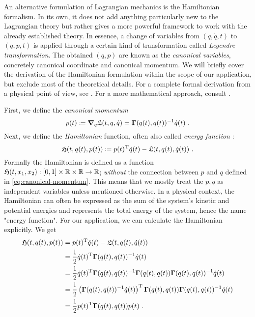 An alternative formulation of Lagrangian mechanics is the Hamiltonian formalism.
In its own, it does not add anything particularly new to the Lagrangian theory but rather gives a more powerful framework to work with the already established theory.
In essence, a change of variables from $(q, \dot{q}, t)$ to $(q, p, t)$ is applied through a certain kind of transformation called \emph{Legendre transformation}.
The obtained $(q, p)$ are known as the \emph{canonical variables}, concretely canonical coordinate and canonical momentum.
We will briefly cover the derivation of the Hamiltonian formulation within the scope of our application, but exclude most of the theoretical details.
For a complete formal derivation from a physical point of view, see \cite[Chapter~8]{goldstein01}.
For a more mathematical approach, consult \cite[Chapter~2]{marsden10}.

First, we define the \emph{canonical momentum}
\begin{equation}
\label{eq:canonical-momentum}
	p(t) \coloneqq \grad_{\dot{q}} \mathfrak{L}(t, q, \dot{q}) = \mathbf{\Gamma}(q(t), q(t))^{-1} \dot{q}(t) \ .
\end{equation}
Next, we define the \emph{Hamiltonian} function, often also called \emph{energy function} \cite{marsden10}:
\begin{equation}
	\mathfrak{H}(t, q(t), p(t)) \coloneqq p(t)^\mathrm{T}\dot{q}(t) - \mathfrak{L}(t, q(t), \dot{q}(t)) \ .
\end{equation}
Formally the Hamiltonian is defined as a function $\mathfrak{H}(t, x_1, x_2): [0,1] \times \mathbb{R} \times \mathbb{R} \rightarrow \mathbb{R}$; \emph{without} the connection between $p$ and $q$ defined in \cref{eq:canonical-momentum}.
This means that we mostly treat the $p, q$ as independent variables unless mentioned otherwise.
In a physical context, the Hamiltonian can often be expressed as the sum of the system's kinetic and potential energies and represents the total energy of the system, hence the name "energy function".
For our application, we can calculate the Hamiltonian explicitly.
We get
\begin{align}
	\mathfrak{H}(t, q(t), p(t)) &=p(t)^\mathrm{T}\dot{q}(t) - \mathfrak{L}(t, q(t), \dot{q}(t))\\
	&= \frac{1}{2} \dot{q}(t)^{\mathrm{T}} \mathbf{\Gamma}(q(t), q(t))^{-1} \dot{q}(t) \\
	&= \frac{1}{2} \dot{q}(t)^{\mathrm{T}} \mathbf{\Gamma}(q(t), q(t))^{-1} \mathbf{\Gamma}(q(t), q(t)) \mathbf{\Gamma}(q(t), q(t))^{-1} \dot{q}(t)\\
	&= \frac{1}{2}  \left(\mathbf{\Gamma}(q(t), q(t))^{-1} \dot{q}(t)\right)^{\mathrm{T}} \mathbf{\Gamma}(q(t), q(t)) \mathbf{\Gamma}(q(t), q(t))^{-1} \dot{q}(t)\\
	&= \frac{1}{2} p(t)^{\mathrm{T}} \mathbf{\Gamma}(q(t), q(t)) p(t) \ .
\end{align}

